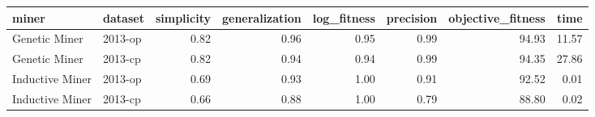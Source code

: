 \begin{tabular}{llrrrrrr}
\toprule
miner & dataset & simplicity & generalization & log_fitness & precision & objective_fitness & time \\
\midrule
Genetic Miner & 2013-op & 0.82 & 0.96 & 0.95 & 0.99 & 94.93 & 11.57 \\
Genetic Miner & 2013-cp & 0.82 & 0.94 & 0.94 & 0.99 & 94.35 & 27.86 \\
Inductive Miner & 2013-op & 0.69 & 0.93 & 1.00 & 0.91 & 92.52 & 0.01 \\
Inductive Miner & 2013-cp & 0.66 & 0.88 & 1.00 & 0.79 & 88.80 & 0.02 \\
\bottomrule
\end{tabular}
